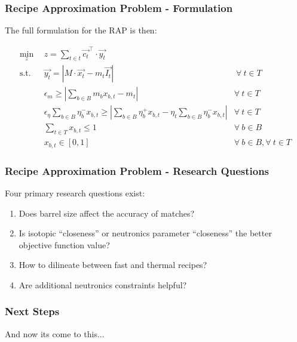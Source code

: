 \begin{frame}[ctb!]
  \frametitle{Recipe Approximation Problem - Formulation}

  The full formulation for the RAP is then:

  \begin{subequations}\label{eqs:rap}
    \begin{align}
      \min_{z} \:\: & 
      z = \sum_{t \in t} \vec{c_{t}}^{\top} \cdot \vec{y_{t}}
      & \label{eqs:rap_obj} \\
      \text{s.t.} \:\: &
      \vec{y_{t}} = \left| M \cdot \vec{x_{t}}  - m_t \vec{I_{t}} \right|
      &
      \: \forall \: t \in T \label{eqs:rap_iso} \\
      &
      \epsilon_{m} \geq \left| \sum_{b \in B} m_{b} x_{b, t} - m_{t} \right|
      & 
      \forall \: t \in T \label{eqs:rap_mass} \\
      &
      \epsilon_{\eta} \sum_{b \in B} \eta_{b}^{-} x_{b, t} \geq 
      \left| \sum_{b \in B} \eta_{b}^{+} x_{b, t} - 
      \eta_{t} \sum_{b \in B} \eta_{b}^{-} x_{b, t} \right|
      & 
      \forall \: t \in T \label{eqs:rap_eta} \\
      &
      \sum_{t \in T} x_{b, t} \leq 1
      & 
      \forall \: b \in B \label{eqs:rap_conserv} \\
      &
      x_{b, t} \in \left[ 0, 1 \right]
      & 
      \forall \: b \in B, \forall \: t \in T  \label{eqs:rap_x}
    \end{align}
  \end{subequations}
\end{frame}

\begin{frame}[ctb!]
  \frametitle{Recipe Approximation Problem - Research Questions} 

  Four primary research questions exist:

  \begin{enumerate}
    \item Does barrel size affect the accuracy of matches?
    \item Is isotopic ``closeness'' or neutronics parameter ``closeness'' the
      better objective function value?
    \item How to dilineate between fast and thermal recipes?
    \item Are additional neutronics constraints helpful?
  \end{enumerate}
\end{frame}

\begin{frame}[ctb!]
  \frametitle{Next Steps} 

  And now its come to this...
\end{frame}
